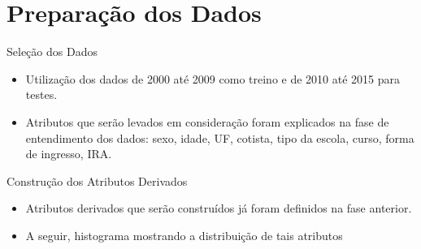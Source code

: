 
\section{Preparação dos Dados}
\begin{frame}{Seleção dos Dados}
\begin{itemize}[itemsep=3ex]
    \item Utilização dos dados de 2000 até 2009 como treino e de 2010 até 2015 para
        testes. 
    \item Atributos que serão levados em consideração foram explicados na fase de
        entendimento dos dados: sexo, idade, UF, cotista, tipo da escola,
        curso, forma de ingresso, IRA.
\end{itemize}
\end{frame}

\begin{frame}{Construção dos Atributos Derivados}
\begin{itemize}[itemsep=3ex]
    \item Atributos derivados que serão construídos já foram definidos na fase
        anterior.
    \item A seguir, histograma mostrando a distribuição de tais atributos
\end{itemize}
\end{frame}

